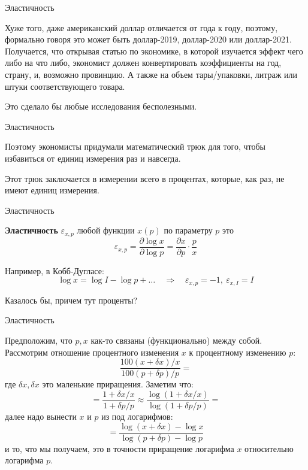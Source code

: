 \documentclass{beamer}
\begin{document}
\begin{frame}{Эластичность}

Хуже того, даже американский доллар отличается от года к году, поэтому, формально говоря это может быть доллар-2019, доллар-2020 или доллар-2021. Получается, что открывая статью по экономике, в которой изучается эффект чего либо на что либо, экономист должен конвертировать коэффициенты на год, страну, и, возможно провинцию. А также на объем тары/упаковки, литраж или штуки соответствующего товара. 

Это сделало бы любые исследования бесполезными.

\end{frame}

\begin{frame}{Эластичность}

Поэтому экономисты придумали математический трюк для того, чтобы избавиться от единиц измерения раз и навсегда. 

Этот трюк заключается в измерении всего в процентах, которые, как раз, не имеют единиц измерения.

\end{frame}

\begin{frame}{Эластичность}

\begin{definition}
\textbf{Эластичность} $\varepsilon_{x,p}$ любой функции $x(p)$ по параметру $p$ это 
$$ \varepsilon_{x,p} = \frac{\partial \log x}{\partial \log p} = \frac{\partial x}{\partial p} \cdot \frac{p}{x}$$	
\end{definition}

Например, в Кобб-Дугласе:
$$\log x = \log I - \log p + \ldots \quad \Rightarrow \quad \varepsilon_{x,p} = -1, \ \varepsilon_{x,I} = I $$

Казалось бы, причем тут проценты?

\end{frame}

\begin{frame}{Эластичность}

Предположим, что $p,x$ как-то связаны (функционально) между собой. Рассмотрим отношение процентного изменения $x$ к процентному изменению $p$:
$$\frac{100 (x + \delta x) / x}{100 (p + \delta p) / p}=$$
где $\delta x, \delta x$ это маленькие приращения. Заметим что:
$$=\frac{1 + \delta x / x}{1 + \delta p / p} \approx \frac{\log(1 + \delta x / x)}{\log(1 + \delta p / p)}=$$
далее надо вынести $x$ и $p$ из под логарифмов:
$$=\frac{\log(x + \delta x) - \log x}{\log(p + \delta p) - \log p}$$
и то, что мы получаем, это в точности приращение логарифма $x$ относительно логарифма $p$.

\end{frame}
\end{document}

